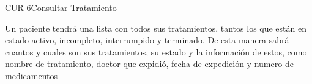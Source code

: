 \begin{UseCase}{CUR 6}{Consultar Tratamiento}
    {
    	
    	Un paciente tendrá una lista con todos sus tratamientos, tantos los que están en estado activo, incompleto, interrumpido y terminado. De esta manera sabrá cuantos y cuales son sus tratamientos, su estado y la información de estos, como nombre de tratamiento, doctor que expidió, fecha de expedición y numero de medicamentos
    	
    	
    }


\end{UseCase}
